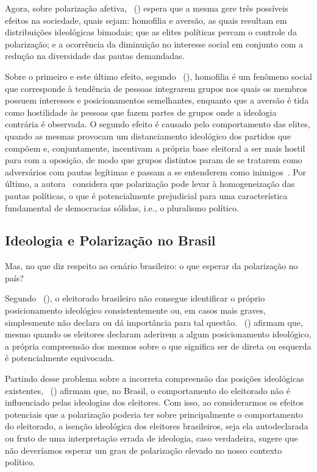 \documentclass[
	12pt,				%
	openright,			%
	twoside,			%
	a4paper,			%
	openany,
	english,			%
	brazil				%
	]{abntex2}
\begin{document}
Agora, sobre polarização afetiva, ~(\citeyear{Bednar2021Dec}) espera que a mesma gere três possíveis efeitos na sociedade, quais sejam: homofilia e aversão, as quais resultam em distribuições ideológicas bimodais; que as elites políticas percam o controle da polarização; e a ocorrência da diminuição no interesse social em conjunto com a redução na diversidade das pautas demandadas.

Sobre o primeiro e este último efeito, segundo ~(\citeyear{Bednar2021Dec}), homofilia é um fenômeno social que corresponde à tendência de pessoas integrarem grupos nos quais os membros possuem interesses e posicionamentos semelhantes, enquanto que a aversão é tida como hostilidade às pessoas que fazem partes de grupos onde a ideologia contrária é observada. O segundo efeito é causado pelo comportamento das elites, quando as mesmas provocam um distanciamento ideológico dos partidos que compõem e, conjuntamente, incentivam a própria base eleitoral a ser mais hostil para com a oposição, de modo que grupos distintos param de se tratarem como adversários com pautas legítimas e passam a se entenderem como inimigos~\cite{Bednar2021Dec}. Por último, a autora~\cite{Bednar2021Dec} considera que polarização pode levar à homogeneização das pautas políticas, o que é potencialmente prejudicial para uma característica fundamental de democracias sólidas, i.e., o pluralismo político.

\subsection{Ideologia e Polarização no Brasil}

Mas, no que diz respeito ao cenário brasileiro: o que esperar da polarização no país?

Segundo ~(\citeyear{Oliveira2015Sep}), o eleitorado brasileiro não consegue identificar o próprio posicionamento ideológico consistentemente ou, em casos mais graves, simplesmente não declara ou dá importância para tal questão. ~(\citeyear{Oliveira2015Sep}) afirmam que, mesmo quando os eleitores declaram aderirem a algum posicionamento ideológico, a própria compreensão dos mesmos sobre o que significa ser de direta ou esquerda é potencialmente equivocada.

Partindo desse problema sobre a incorreta compreensão das posições ideológicas existentes, ~(\citeyear{Oliveira2015Sep}) afirmam que, no Brasil, o comportamento do eleitorado não é influenciado pelas ideologias dos eleitores. Com isso, ao considerarmos os efeitos potenciais que a polarização poderia ter sobre principalmente o comportamento do eleitorado, a isenção ideológica dos eleitores brasileiros, seja ela autodeclarada ou fruto de uma interpretação errada de ideologia, caso verdadeira, sugere que não deveríamos esperar um grau de polarização elevado no nosso contexto político. 
\end{document}
